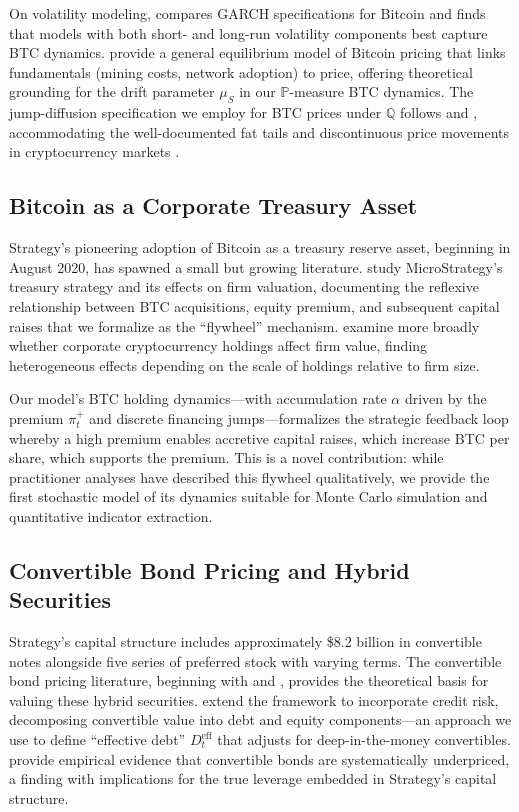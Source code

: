 On volatility modeling, \citet{katsiampa2017volatility} compares GARCH specifications for Bitcoin and finds that models with both short- and long-run volatility components best capture BTC dynamics.
\citet{biais2023equilibrium} provide a general equilibrium model of Bitcoin pricing that links fundamentals (mining costs, network adoption) to price, offering theoretical grounding for the drift parameter $\mu_S$ in our $\mathbb{P}$-measure BTC dynamics.
The jump-diffusion specification we employ for BTC prices under $\mathbb{Q}$ follows \citet{merton1976option} and \citet{kou2002jump}, accommodating the well-documented fat tails and discontinuous price movements in cryptocurrency markets \citep{griffin2020bitcoin}.

\subsection{Bitcoin as a Corporate Treasury Asset}

Strategy's pioneering adoption of Bitcoin as a treasury reserve asset, beginning in August 2020, has spawned a small but growing literature.
\citet{vanelli2024bitcoin} study MicroStrategy's treasury strategy and its effects on firm valuation, documenting the reflexive relationship between BTC acquisitions, equity premium, and subsequent capital raises that we formalize as the ``flywheel'' mechanism.
\citet{amin2024corporate} examine more broadly whether corporate cryptocurrency holdings affect firm value, finding heterogeneous effects depending on the scale of holdings relative to firm size.

Our model's BTC holding dynamics---with accumulation rate $\alpha$ driven by the premium $\pi_t^+$ and discrete financing jumps---formalizes the strategic feedback loop whereby a high premium enables accretive capital raises, which increase BTC per share, which supports the premium.
This is a novel contribution: while practitioner analyses have described this flywheel qualitatively, we provide the first stochastic model of its dynamics suitable for Monte Carlo simulation and quantitative indicator extraction.

\subsection{Convertible Bond Pricing and Hybrid Securities}

Strategy's capital structure includes approximately \$8.2 billion in convertible notes alongside five series of preferred stock with varying terms.
The convertible bond pricing literature, beginning with \citet{brennan1977convertible} and \citet{ingersoll1977contingent}, provides the theoretical basis for valuing these hybrid securities.
\citet{tsiveriotis1998valuing} extend the framework to incorporate credit risk, decomposing convertible value into debt and equity components---an approach we use to define ``effective debt'' $D_t^{\text{eff}}$ that adjusts for deep-in-the-money convertibles.
\citet{ammann2003pricing} provide empirical evidence that convertible bonds are systematically underpriced, a finding with implications for the true leverage embedded in Strategy's capital structure.

